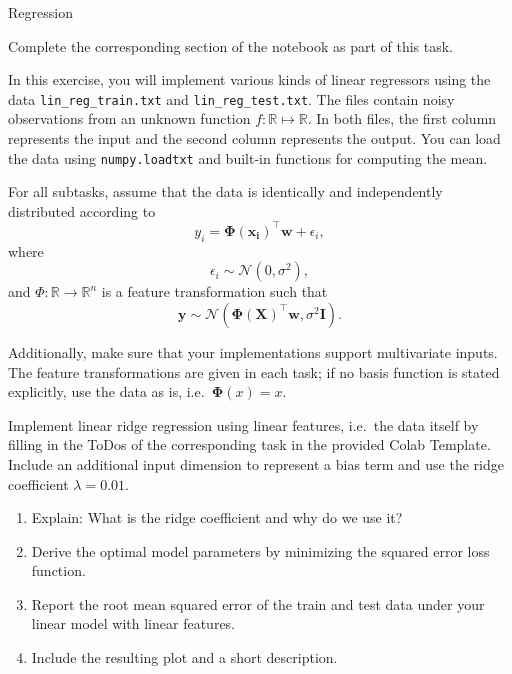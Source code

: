\documentclass[
	english,
        solution=true
	]{tudaexercise}
\begin{document}
\begin{task}[points=34]{Regression}
\begin{programmingtaskbox}
Complete the corresponding section of the notebook as part of this task.
\end{programmingtaskbox}
In this exercise, you will implement various kinds of linear regressors using the data \texttt{lin\_reg\_train.txt} and \texttt{lin\_reg\_test.txt}.
The files contain noisy observations from an unknown function $f: \mathbb{R} \mapsto \mathbb{R}$.
In both files, the first column represents the input and the second column represents the output.
You can load the data using \texttt{numpy.loadtxt} and built-in functions for computing the mean.

For all subtasks, assume that the data is identically and independently distributed according to
\begin{equation*}
    y_i = \bm{\Phi}(\mathbf{x_i})^\top \mathbf{w} + \epsilon_i,
\end{equation*}
where
\begin{equation*}
\epsilon_i \sim \mathcal{N}(0, \sigma^2),
\end{equation*}
    and $\Phi: \mathbb{R} \rightarrow \mathbb{R}^n$ is a feature transformation
such that
\begin{equation*}
    \mathbf{y} \sim \mathcal{N}(\bm{\Phi}(\mathbf{X})^\top \mathbf{w}, \sigma^2 \mathbf{I}).
\end{equation*}

Additionally, make sure that your implementations support multivariate inputs. The feature transformations
    are given in each task; if no basis function is stated explicitly, use the data as is, i.e.~$\bm{\Phi}(x) = x$.

\begin{subtask}[points=8, title=Linear Features]
Implement linear ridge regression using linear features, i.e.~the data itself by filling in the ToDos of the corresponding task in the provided Colab Template.
Include an additional input dimension to represent a bias term and use the ridge coefficient $\lambda = 0.01$.
\\
\begin{enumerate}
\item Explain: What is the ridge coefficient and why do we use it? 
\item Derive the optimal model parameters by minimizing the squared error loss function. 
\item Report the root mean squared error of the train and test data under your linear model with linear features. 
\item Include the resulting plot and a short description. 
\end{enumerate}


\end{subtask}
\end{task}
\end{document}
